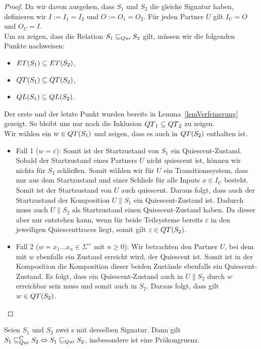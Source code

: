 \begin{proof}
  Da wir davon ausgehen, dass $S_1$ und $S_2$ die gleiche Signatur haben,
  definieren wir $I:=I_1=I_2$ und $O:=O_1=O_2$. Für jeden Partner $U$ gilt
  $I_U=O$ und $O_U=I$.\\
  Um zu zeigen, dass die Relation $S_1\sqsubseteq _{Qui} S_2$ gilt, müssen wir die
  folgenden Punkte nachweisen:
  \begin{itemize}
    \item $ET{}(S_1)\subseteq ET{}(S_2)$,
    \item $QT{}(S_1)\subseteq QT{}(S_2)$,
    \item $QL{}(S_1)\subseteq QL{}(S_2)$.
  \end{itemize}
  Der erste und der letzte Punkt wurden bereits in Lemma~\ref{lemVerfeinerung}
  gezeigt. So bleibt uns nur noch die Inklusion $QT{}_1\subseteq QT{}_2$ zu
  zeigen.\\
  Wir wählen ein $w\in QT{}(S_1)$ und zeigen, dass es auch in $QT{}(S_2)$
  enthalten ist.
  \begin{itemize}
    \item Fall 1 ($w=\varepsilon$): Somit ist der Startzustand von $S_1$ ein
      Quiescent-Zustand. Sobald der Startzustand eines Partners $U$ nicht
      quiescent ist, können wir nichts für $S_2$ schließen. Somit wählen wir
      für $U$ ein Transitionssystem, dass nur aus dem Startzustand und einer
      Schliefe für alle Inputs $x\in I_U$ besteht. Somit ist der Startzustand
      von $U$ auch quiescent. Daraus folgt, dass auch der Startzustand der
      Komposition $U\|S_1$ ein Quiescent-Zustand ist. Dadurch muss auch
      $U\|S_2$ als Startzustand einen Quiescent-Zustand haben. Da dieser aber
      nur entstehen kann, wenn für beide Teilsysteme bereits $\varepsilon$ in
      den jeweiligen Quiescenttraces liegt, somit gilt $\varepsilon\in
      QT{}(S_2)$.
    \item Fall 2 ($w=x_1\dots x_n\in\Sigma ^+$ mit $n\geq 0$): Wir betrachten
      den Partner $U$, bei dem mit $w$ ebenfalls ein Zustand erreicht wird, der
      Quiescent ist. Somit ist in der Komposition die Komposition dieser
      beiden Zustände ebenfalls ein Quiescent-Zustand. Es folgt, dass ein
      Quiescent-Zustand auch in $U\|S_2$ durch $w$ erreichbar sein muss und
      somit auch in $S_2$. Daraus folgt, dass gilt $w\in QT{}(S_2)$.
  \end{itemize}
\end{proof}

\begin{satz}
  \label{satzQuiFullAbst}
  Seien $S_1$ und $S_2$ zwei \EIO{}s mit derselben Signatur. Dann gilt
  $S_1\sqsubseteq _{Qui}^C S_2\Leftrightarrow S_1\sqsubseteq _{Qui} S_2$, insbesondere ist \QRel{} eine
  Präkongruenz.
\end{satz}

